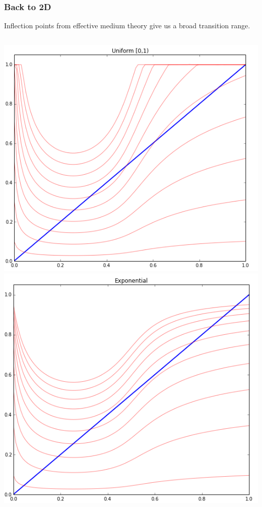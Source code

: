 \documentclass[mathserif]{beamer}
\begin{document}
\begin{frame}
\frametitle{Back to 2D}
Inflection points from effective medium theory give us a broad transition
range.
\begin{columns}
\includegraphics[width=\textwidth]{2D_MF_Uniform01.png}
\includegraphics[width=\textwidth]{2D_MF_Exponential.png}
\end{columns}

\end{frame}
\end{document}
